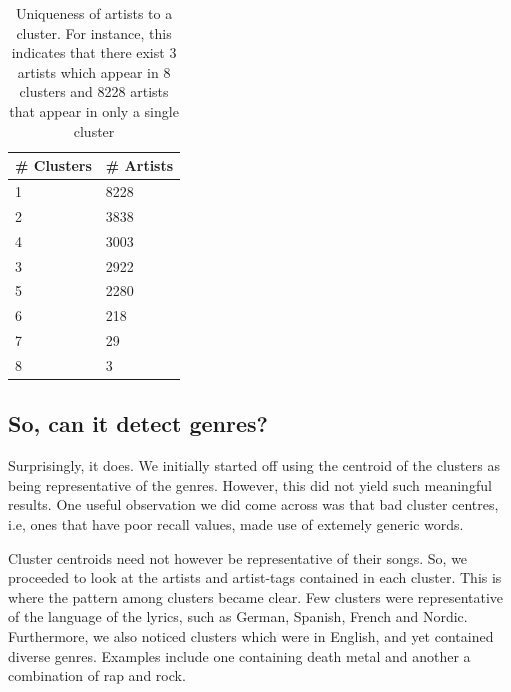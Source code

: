 \documentclass[10pt,a4paper]{scrartcl}
\begin{document}
\begin{table}[!t]
\caption{Uniqueness of artists to a cluster. For instance, this indicates that there exist 3 artists which appear in 8 clusters and 8228 artists that appear in only a single cluster}
\centering
\begin{tabular}{@{}ll@{}}
\toprule
\# Clusters & \# Artists \\ \midrule
1             & 8228         \\
2             & 3838         \\
4             & 3003         \\
3             & 2922         \\
5             & 2280         \\
6             & 218          \\
7             & 29           \\
8             & 3            \\ \bottomrule
\end{tabular}
\label{tab:num_artists_clusters}
\end{table}
  
  \subsection{So, can it detect genres?}
  Surprisingly, it does.
  We initially started off using the centroid of the clusters as being representative of the genres.
  However, this did not yield such meaningful results.
  One useful observation we did come across was that bad cluster centres, i.e, ones that have poor recall values, made use of extemely generic words.
  
  Cluster centroids need not however be representative of their songs.
  So, we proceeded to look at the artists and artist-tags contained in each cluster.
  This is where the pattern among clusters became clear.
  Few clusters were representative of the language of the lyrics, such as German, Spanish, French and Nordic.
  Furthermore, we also noticed clusters which were in English, and yet contained diverse genres.
  Examples include one containing death metal and another a combination of rap and rock.
  
\end{document}
